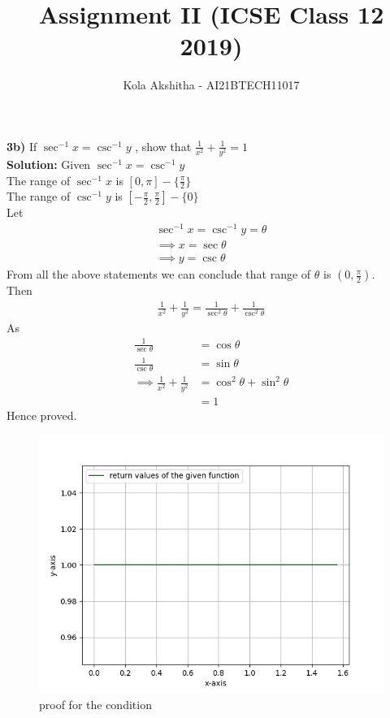 \documentclass[journal,12pt,twocolumn]{IEEEtran}
\title{Assignment II (ICSE Class 12 2019)}
\author{Kola Akshitha - AI21BTECH11017}
\begin{document}
\maketitle
\textbf{3b)} 
If $\sec^{-1}x = \csc^{-1}y$ , show that $\frac{1}{x^{2}}+\frac{1}{y^{2}} = 1$
\\
\textbf{Solution:}
 Given $\sec^{-1}x = \csc^{-1}y$\\
 The range of $\sec^{-1}x$ is $[0,\pi]-\lbrace\frac{\pi}{2}\rbrace$ \\
 The range of $\csc^{-1}y$ is $[-\frac{\pi}{2},\frac{\pi}{2}]-\lbrace0\rbrace$ \\
 Let  
\begin{align} 
 \sec^{-1}x = \csc^{-1}y = \theta \nonumber
 \\
\implies x = \sec\theta 
 \\
\implies y = \csc\theta 
 \end{align}
 From all the above statements we can conclude that range of $\theta$ is $\left(0,\frac{\pi}{2}\right).$ \\
 Then
 \begin{align}
 \frac{1}{x^{2}}+\frac{1}{y^{2}} = \frac{1}{\sec^{2}\theta}+\frac{1}{\csc^{2}\theta}
 \end{align}
 As
 \begin{align}
  \frac{1}{\sec\theta}&=\cos\theta \nonumber
  \\
   \frac{1}{\csc\theta}&=\sin\theta \nonumber
 \\
\implies \frac{1}{x^{2}}+\frac{1}{y^{2}}&=\cos^{2}\theta+\sin^{2}\theta
\\
&=1 \nonumber
 \end{align}
 Hence proved.
\begin{figure}[!ht]
 \centering
 \includegraphics[width=\columnwidth]{code/figure2.png}
 \caption{proof for the condition}
 \label{fig-1}
 \end{figure}
 
 
\end{document}
